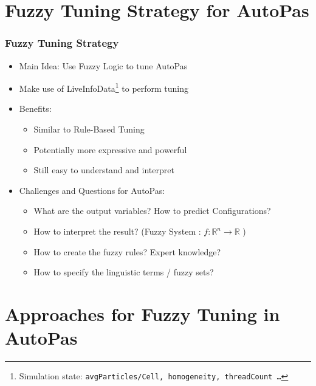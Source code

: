 \documentclass[
	10pt,
	t		%
]{beamer}
\begin{document}
\section{Fuzzy Tuning Strategy for AutoPas}
\begin{frame}
	\frametitle{Fuzzy Tuning Strategy}

	\begin{itemize}
		\item Main Idea: Use Fuzzy Logic to tune AutoPas
		\item Make use of LiveInfoData\footnote{Simulation state: \texttt{avgParticles/Cell, homogeneity, threadCount \dots }} to perform tuning
		\item Benefits:
		      \begin{itemize}
			      \item Similar to Rule-Based Tuning
			      \item Potentially more expressive and powerful
			      \item Still easy to understand and interpret
		      \end{itemize}
		\item Challenges and Questions for AutoPas:
		      \begin{itemize}
			      \item What are the output variables? How to predict Configurations?
			      \item How to interpret the result? (Fuzzy System : $f :\mathbb{R}^n \rightarrow \mathbb{R}$ )
			      \item How to create the fuzzy rules? Expert knowledge?
			      \item How to specify the linguistic terms / fuzzy sets?
		      \end{itemize}
	\end{itemize}
\end{frame}

\section{Approaches for Fuzzy Tuning in AutoPas}
\end{document}
